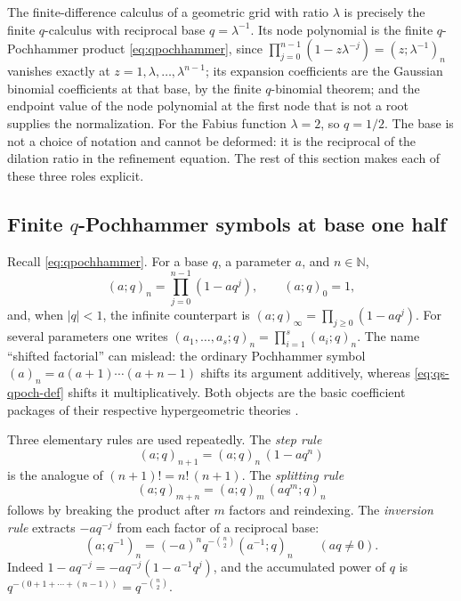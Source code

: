 \documentclass[11pt,oneside]{article}
\theoremstyle{definition}
\theoremstyle{remark}
\newcommand{\N}{\mathbb N}
\begin{document}
The finite-difference calculus of a geometric grid with ratio $\lambda$ is precisely the
finite $q$-calculus with reciprocal base $q=\lambda^{-1}$.  Its node polynomial is the
finite $q$-Pochhammer product \eqref{eq:qpochhammer}, since
$\prod_{j=0}^{n-1}(1-z\lambda^{-j})=(z;\lambda^{-1})_n$ vanishes exactly at
$z=1,\lambda,\ldots,\lambda^{n-1}$; its expansion coefficients are the Gaussian binomial
coefficients at that base, by the finite $q$-binomial theorem; and the endpoint value of the
node polynomial at the first node that is not a root supplies the normalization.  For the
Fabius function $\lambda=2$, so $q=1/2$.  The base is not a choice of notation and cannot be
deformed: it is the reciprocal of the dilation ratio in the refinement equation.  The rest of
this section makes each of these three roles explicit.

\subsection{Finite $q$-Pochhammer symbols at base one half}
\label{subsec:qs-pochhammer}

Recall \eqref{eq:qpochhammer}.  For a base $q$, a parameter $a$, and $n\in\N$,
\begin{equation}
 (a;q)_n=\prod_{j=0}^{n-1}(1-aq^j),\qquad (a;q)_0=1,      \label{eq:qs-qpoch-def}
\end{equation}
and, when $|q|<1$, the infinite counterpart is
$(a;q)_\infty=\prod_{j\ge0}(1-aq^j)$.  For several parameters one writes
$(a_1,\ldots,a_s;q)_n=\prod_{i=1}^{s}(a_i;q)_n$.  The name ``shifted factorial'' can mislead:
the ordinary Pochhammer symbol $(a)_n=a(a+1)\cdots(a+n-1)$ shifts its argument additively,
whereas \eqref{eq:qs-qpoch-def} shifts it multiplicatively.  Both objects are the basic
coefficient packages of their respective hypergeometric theories
\cite{andrews1976,gasper2004,kac2002,dlmf17}.

Three elementary rules are used repeatedly.  The \emph{step rule}
\begin{equation}
 (a;q)_{n+1}=(a;q)_n\,(1-aq^n)                            \label{eq:qs-step}
\end{equation}
is the analogue of $(n+1)!=n!\,(n+1)$.  The \emph{splitting rule}
\begin{equation}
 (a;q)_{m+n}=(a;q)_m\,(aq^m;q)_n                          \label{eq:qs-split}
\end{equation}
follows by breaking the product after $m$ factors and reindexing.  The \emph{inversion rule}
extracts $-aq^{-j}$ from each factor of a reciprocal base:
\begin{equation}
 (a;q^{-1})_n=(-a)^nq^{-\binom n2}(a^{-1};q)_n
 \qquad(aq\ne0).                                          \label{eq:qs-inversion}
\end{equation}
Indeed $1-aq^{-j}=-aq^{-j}(1-a^{-1}q^{j})$, and the accumulated power of $q$ is
$q^{-(0+1+\cdots+(n-1))}=q^{-\binom n2}$.
\end{document}
